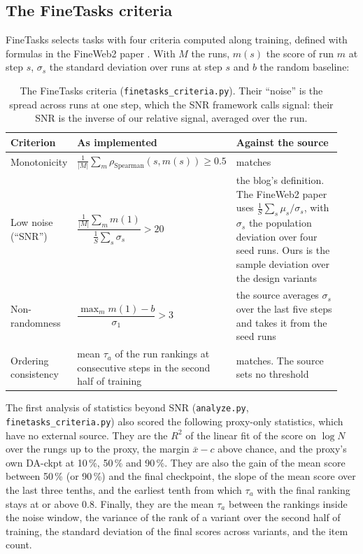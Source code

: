 \subsection{The FineTasks criteria}
\label{app:sur-finetasks}

FineTasks \citep{kydlicek_finetasks_nodate} selects tasks with four criteria computed along training, defined with formulas in the FineWeb2 paper \citep{penedo_fineweb2_2025}.
With $M$ the runs, $m(s)$ the score of run $m$ at step $s$, $\sigma_s$ the standard deviation over runs at step $s$ and $b$ the random baseline:

\begin{table}[h]
\centering
\scriptsize
\begin{tabular}{@{}p{0.14\linewidth}p{0.33\linewidth}p{0.47\linewidth}@{}}
\toprule
\textbf{Criterion} & \textbf{As implemented} & \textbf{Against the source} \\
\midrule
Monotonicity & $\frac{1}{|M|}\sum_{m}\rho_{\text{Spearman}}(s, m(s)) \geq 0.5$ & matches \\
Low noise (``SNR'') & $\dfrac{\frac{1}{|M|}\sum_m m(1)}{\frac{1}{S}\sum_s \sigma_s} > 20$ & the blog's definition. The FineWeb2 paper uses $\frac{1}{S}\sum_s \mu_s/\sigma_s$, with $\sigma_s$ the population deviation over four seed runs. Ours is the sample deviation over the design variants \\
Non-randomness & $\dfrac{\max_m m(1) - b}{\sigma_{1}} > 3$ & the source averages $\sigma_s$ over the last five steps and takes it from the seed runs \\
Ordering consistency & mean $\tau_a$ of the run rankings at consecutive steps in the second half of training & matches. The source sets no threshold \\
\bottomrule
\end{tabular}
\caption{The FineTasks criteria (\texttt{finetasks\_criteria.py}). Their ``noise'' is the spread across runs at one step, which the SNR framework calls signal: their SNR is the inverse of our relative signal, averaged over the run.}
\label{tab:sur-finetasks}
\end{table}

The first analysis of statistics beyond SNR (\texttt{analyze.py}, \texttt{finetasks\_criteria.py}) also scored the following proxy-only statistics, which have no external source. They are the $R^2$ of the linear fit of the score on $\log N$ over the rungs up to the proxy, the margin $\bar{x} - c$ above chance, and the proxy's own DA-ckpt at 10\,\%, 50\,\% and 90\,\%. They are also the gain of the mean score between 50\,\% (or 90\,\%) and the final checkpoint, the slope of the mean score over the last three tenths, and the earliest tenth from which $\tau_a$ with the final ranking stays at or above 0.8. Finally, they are the mean $\tau_a$ between the rankings inside the noise window, the variance of the rank of a variant over the second half of training, the standard deviation of the final scores across variants, and the item count.

